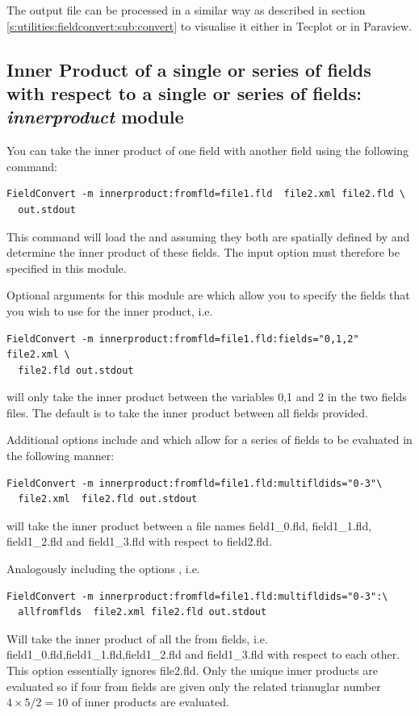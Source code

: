 The output file  can be processed in a similar
way as described in section \ref{s:utilities:fieldconvert:sub:convert}
to visualise it either in Tecplot or in Paraview.


\subsection{Inner Product of a single or series of fields with respect to a single or series of fields: \textit{innerproduct} module}
You can take the inner product of one field with another field using
the following command:
\begin{lstlisting}[style=BashInputStyle]
  FieldConvert -m innerproduct:fromfld=file1.fld  file2.xml file2.fld \
  out.stdout
\end{lstlisting}
This command will load the  and 
assuming they both are spatially defined by \inltt{files.xml} and
determine the inner product of these fields. The input option
 must therefore be specified in this module.

Optional arguments for this module are  which allow you to specify
the fields that you wish to use for the inner product, i.e.
\begin{lstlisting}[style=BashInputStyle]
  FieldConvert -m innerproduct:fromfld=file1.fld:fields="0,1,2" file2.xml \
  file2.fld out.stdout
\end{lstlisting}
will only take the inner product between the variables 0,1 and 2 in
the two fields files. The default is to take the inner product between
all fields provided.

Additional options include  and 
which allow for a series of fields to be evaluated in the following
manner:
\begin{lstlisting}[style=BashInputStyle]
  FieldConvert -m innerproduct:fromfld=file1.fld:multifldids="0-3"\
  file2.xml  file2.fld out.stdout
\end{lstlisting}
will take the inner product between a file names
field1\_0.fld, field1\_1.fld, field1\_2.fld and field1\_3.fld with
respect to field2.fld.

Analogously including the options \inltt{allfromflds}, i.e.
\begin{lstlisting}[style=BashInputStyle]
  FieldConvert -m innerproduct:fromfld=file1.fld:multifldids="0-3":\
  allfromflds  file2.xml file2.fld out.stdout
\end{lstlisting}
Will take the inner product of all the from fields,
i.e. field1\_0.fld,field1\_1.fld,field1\_2.fld and field1\_3.fld with
respect to each other. This option essentially ignores file2.fld. Only
the unique inner products are evaluated so if four from fields are
given only the related trianuglar number $4\times5/2=10$ of inner
products are evaluated.

